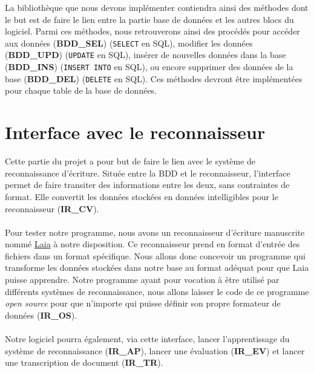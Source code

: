 La bibliothèque que nous devons implémenter contiendra ainsi des méthodes dont
le but est de faire le lien entre la partie base de données et les autres
blocs du logiciel. Parmi ces méthodes, nous retrouverons ainsi des procédés
pour accéder aux données (\textbf{BDD\_SEL}) (\texttt{SELECT} en SQL),
modifier les données (\textbf{BDD\_UPD}) (\texttt{UPDATE} en SQL), insérer de
nouvelles données dans la base (\textbf{BDD\_INS}) (\texttt{INSERT INTO} en
SQL), ou encore supprimer des données de la base (\textbf{BDD\_DEL})
(\texttt{DELETE} en SQL). Ces méthodes devront être implémentées pour chaque
table de la base de données.

\section{Interface avec le reconnaisseur}

Cette partie du projet a pour but de faire le lien avec le système de
reconnaissance d’écriture. Située entre la BDD et le reconnaisseur,
l’interface permet de faire transiter des informations entre les deux, sans
contraintes de format. Elle convertit les données stockées en données
intelligibles pour le reconnaisseur (\textbf{IR\_CV}).

\paragraph{}
Pour tester notre programme, nous avons un reconnaisseur d’écriture
manuscrite nommé
\href{https://github.com/jpuigcerver/Laia/tree/master/egs/iam}{Laia} à notre
disposition. Ce reconnaisseur prend en format d’entrée des fichiers dans un
format spécifique. Nous allons donc concevoir un programme qui transforme les
données stockées dans notre base au format adéquat pour que Laia puisse
apprendre. Notre programme ayant pour vocation à être utilisé par différents
systèmes de reconnaissance, nous allons laisser le code de ce programme
\textit{open source} pour que n’importe qui puisse définir son propre
formateur de données (\textbf{IR\_OS}).

\paragraph{}
Notre logiciel pourra également, via cette interface, lancer
l’apprentissage du système de reconnaissance (\textbf{IR\_AP}), lancer une
évaluation (\textbf{IR\_EV}) et lancer une transcription de document
(\textbf{IR\_TR}).
